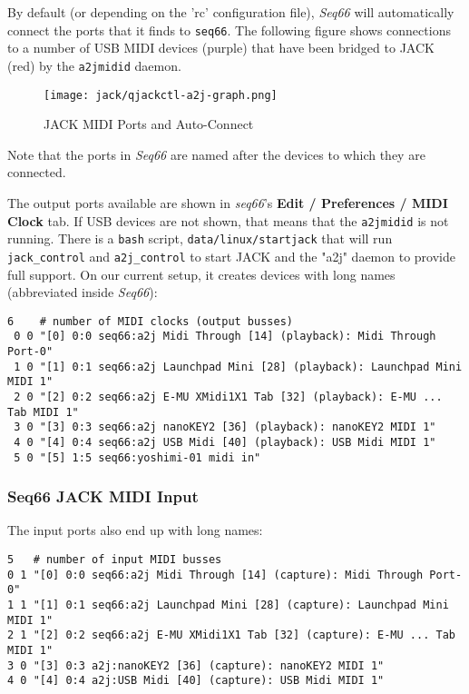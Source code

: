    By default (or depending on the 'rc' configuration file),
   \textsl{Seq66} will
   automatically connect the ports that it finds to \texttt{seq66}.
   The following figure shows connections to a number of USB MIDI devices
   (purple) that have been bridged to JACK (red) by the \texttt{a2jmidid}
   daemon.

\begin{figure}[H]
   \centering 
   \texttt{[image: jack/qjackctl-a2j-graph.png]}
   \caption{JACK MIDI Ports and Auto-Connect}
   \label{fig:jack_midi_ports_auto_connect}
\end{figure}

   Note that the ports in \textsl{Seq66} are named after the devices to which
   they are connected.

	The output ports available are shown in \textsl{seq66}'s
	\textbf{Edit / Preferences / MIDI Clock} tab.
   If USB devices are not shown, that means
   that the \texttt{a2jmidid} is not running.
   There is a \texttt{bash} script, \texttt{data/linux/startjack}
   that will run \texttt{jack\_control} and \texttt{a2j\_control} to start JACK
   and the "a2j" daemon to provide full support.
   On our current setup, it creates devices with long names (abbreviated inside
   \textsl{Seq66}):

   \begin{verbatim}
6    # number of MIDI clocks (output busses)
 0 0 "[0] 0:0 seq66:a2j Midi Through [14] (playback): Midi Through Port-0"
 1 0 "[1] 0:1 seq66:a2j Launchpad Mini [28] (playback): Launchpad Mini MIDI 1"
 2 0 "[2] 0:2 seq66:a2j E-MU XMidi1X1 Tab [32] (playback): E-MU ... Tab MIDI 1"
 3 0 "[3] 0:3 seq66:a2j nanoKEY2 [36] (playback): nanoKEY2 MIDI 1"
 4 0 "[4] 0:4 seq66:a2j USB Midi [40] (playback): USB Midi MIDI 1"
 5 0 "[5] 1:5 seq66:yoshimi-01 midi in"
   \end{verbatim}

\subsubsection{Seq66 JACK MIDI Input}
\label{subsubsec:jack_midi_input}

   The input ports also end up with long names:

   \begin{verbatim}
5   # number of input MIDI busses
0 1 "[0] 0:0 seq66:a2j Midi Through [14] (capture): Midi Through Port-0"
1 1 "[1] 0:1 seq66:a2j Launchpad Mini [28] (capture): Launchpad Mini MIDI 1"
2 1 "[2] 0:2 seq66:a2j E-MU XMidi1X1 Tab [32] (capture): E-MU ... Tab MIDI 1"
3 0 "[3] 0:3 a2j:nanoKEY2 [36] (capture): nanoKEY2 MIDI 1"
4 0 "[4] 0:4 a2j:USB Midi [40] (capture): USB Midi MIDI 1"
   \end{verbatim}

